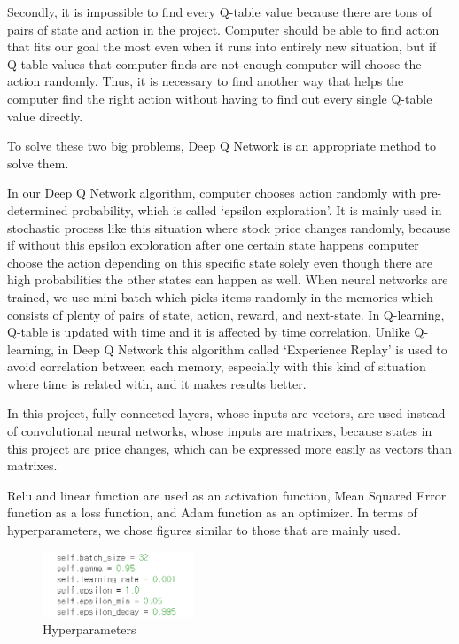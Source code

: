 Secondly, it is impossible to find every Q-table value because there are tons of pairs of state and action in the project. Computer should be able to find action that fits our goal the most even when it runs into entirely new situation, but if Q-table values that computer finds are not enough computer will choose the action randomly. Thus, it is necessary to find another way that helps the computer find the right action without having to find out every single Q-table value directly.

To solve these two big problems, Deep Q Network is an appropriate method to solve them.

In our Deep Q Network algorithm, computer chooses action randomly with pre-determined probability, which is called ‘epsilon exploration’. It is mainly used in stochastic process like this situation where stock price changes randomly, because if without this epsilon exploration after one certain state happens computer choose the action depending on this specific state solely even though there are high probabilities the other states can happen as well. 
When neural networks are trained, we use mini-batch which picks items randomly in the memories which consists of plenty of pairs of state, action, reward, and next-state. In Q-learning, Q-table is updated with time and it is affected by time correlation. Unlike Q-learning, in Deep Q Network this algorithm called ‘Experience Replay’ is used to avoid correlation between each memory, especially with this kind of situation where time is related with, and it makes results better.     

In this project, fully connected layers, whose inputs are vectors, are used instead of convolutional neural networks, whose inputs are matrixes, because states in this project are price changes, which can be expressed more easily as vectors than matrixes. 

Relu and linear function are used as an activation function, Mean Squared Error function as a loss function, and Adam function as an optimizer. In terms of hyperparameters, we chose figures similar to those that are mainly used. 

\begin{figure}[H]
\begin{center}
\includegraphics[clip, width=0.4\textwidth]{Graphics/image1.png} \caption{Hyperparameters}
\end{center}
\end{figure}

